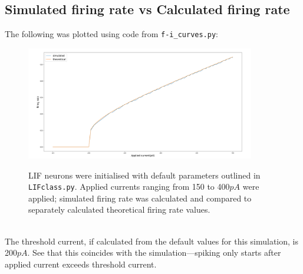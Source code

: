 \documentclass{report}
\begin{document}
\subsection{Simulated firing rate vs Calculated firing rate}
The following was plotted using code from \texttt{f-i\_curves.py}:
\begin{figure}[h]
\begin{center}
\includegraphics[width=10cm]{4}\\
\end{center}
LIF neurons were initialised with default parameters outlined in \texttt{LIFclass.py}. 
Applied currents ranging from 150 to 400$pA$ were applied; simulated firing rate was
calculated and compared to separately calculated theoretical firing rate values.
\end{figure}\\
The threshold current, if calculated from the default values for this simulation, is
200$pA$. See that this coincides with the simulation---spiking only starts after applied
current exceeds threshold current.
\newpage
\end{document}
